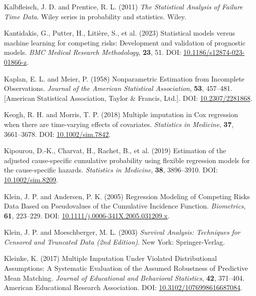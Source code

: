 \documentclass[
  letterpaper,
  DIV=11,
  numbers=noendperiod]{scrreprt}
\newlength{\cslhangindent}
\newenvironment{CSLReferences}[2] %
 {\begin{list}{}{%
  \setlength{\itemindent}{0pt}
  \setlength{\leftmargin}{0pt}
  \setlength{\parsep}{0pt}
  \ifodd #1
   \setlength{\leftmargin}{\cslhangindent}
   \setlength{\itemindent}{-1\cslhangindent}
  \fi
  \setlength{\itemsep}{#2\baselineskip}}}
 {\end{list}}
\begin{document}
\begin{CSLReferences}{1}{1}
Kalbfleisch, J. D. and Prentice, R. L. (2011) \emph{The Statistical
Analysis of Failure Time Data}. Wiley series in probability and
statistics. Wiley.

Kantidakis, G., Putter, H., Litière, S., et al. (2023) Statistical
models versus machine learning for competing risks: Development and
validation of prognostic models. \emph{BMC Medical Research
Methodology}, \textbf{23}, 51. DOI:
\href{https://doi.org/10.1186/s12874-023-01866-z}{10.1186/s12874-023-01866-z}.

Kaplan, E. L. and Meier, P. (1958) Nonparametric {Estimation} from
{Incomplete Observations}. \emph{Journal of the American Statistical
Association}, \textbf{53}, 457--481. {[}American Statistical
Association, Taylor \& Francis, Ltd.{]}. DOI:
\href{https://doi.org/10.2307/2281868}{10.2307/2281868}.

Keogh, R. H. and Morris, T. P. (2018) Multiple imputation in {Cox}
regression when there are time-varying effects of covariates.
\emph{Statistics in Medicine}, \textbf{37}, 3661--3678. DOI:
\href{https://doi.org/10.1002/sim.7842}{10.1002/sim.7842}.

Kipourou, D.-K., Charvat, H., Rachet, B., et al. (2019) Estimation of
the adjusted cause-specific cumulative probability using flexible
regression models for the cause-specific hazards. \emph{Statistics in
Medicine}, \textbf{38}, 3896--3910. DOI:
\href{https://doi.org/10.1002/sim.8209}{10.1002/sim.8209}.

Klein, J. P. and Andersen, P. K. (2005) Regression {Modeling} of
{Competing Risks Data Based} on {Pseudovalues} of the {Cumulative
Incidence Function}. \emph{Biometrics}, \textbf{61}, 223--229. DOI:
\href{https://doi.org/10.1111/j.0006-341X.2005.031209.x}{10.1111/j.0006-341X.2005.031209.x}.

Klein, J. P. and Moeschberger, M. L. (2003) \emph{Survival Analysis:
{Techniques} for Censored and Truncated Data (2nd Edition)}. New York:
Springer-Verlag.

Kleinke, K. (2017) Multiple {Imputation Under Violated Distributional
Assumptions}: {A Systematic Evaluation} of the {Assumed Robustness} of
{Predictive Mean Matching}. \emph{Journal of Educational and Behavioral
Statistics}, \textbf{42}, 371--404. American Educational Research
Association. DOI:
\href{https://doi.org/10.3102/1076998616687084}{10.3102/1076998616687084}.


\end{CSLReferences}
\end{document}
